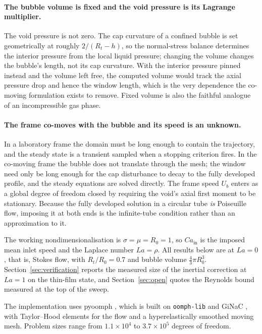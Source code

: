 \documentclass[11pt,a4paper]{article}
\begin{document}
\paragraph{The bubble volume is fixed and the void pressure is its Lagrange
multiplier.} The void pressure is not zero. The cap curvature of a confined
bubble is set geometrically at roughly $2/(R_t-h)$, so the normal-stress
balance determines the interior pressure from the local liquid pressure;
changing the volume changes the bubble's length, not its cap curvature. With
the interior pressure pinned instead and the volume left free, the computed
volume would track the axial pressure drop and hence the window length, which
is the very dependence the co-moving formulation exists to remove. Fixed volume
is also the faithful analogue of an incompressible gas phase.

\paragraph{The frame co-moves with the bubble and its speed is an unknown.} In
a laboratory frame the domain must be long enough to contain the trajectory,
and the steady state is a transient sampled when a stopping criterion fires. In
the co-moving frame the bubble does not translate through the mesh; the window
need only be long enough for the cap disturbance to decay to the fully
developed profile, and the steady equations are solved directly. The frame
speed $U_b$ enters as a global degree of freedom closed by requiring the void's
axial first moment to be stationary. Because the fully developed solution in a
circular tube \emph{is} Poiseuille flow, imposing it at both ends is the
infinite-tube condition rather than an approximation to it.

The working nondimensionalisation is $\sigma=\mu=R_0=1$, so $Ca_{\mathrm{in}}$
is the imposed mean inlet speed and the Laplace number $La=\rho$. All results
below are at $La=0$, that is, Stokes flow, with $R_t/R_0=0.7$ and bubble volume
$\tfrac43\pi R_0^3$. Section~\ref{sec:verification} reports the measured size
of the inertial correction at $La=1$ on the thin-film state, and
Section~\ref{sec:open} quotes the Reynolds bound measured at the top of the
sweep.

The implementation uses pyoomph \citep{diddens2024bifurcation}, which is built
on \texttt{oomph-lib} \citep{heil2006oomph} and GiNaC \citep{bauer2002ginac},
with Taylor--Hood elements for the flow and a hyperelastically smoothed moving
mesh. Problem sizes range from $1.1\times10^4$ to $3.7\times10^5$ degrees of
freedom.
\end{document}
